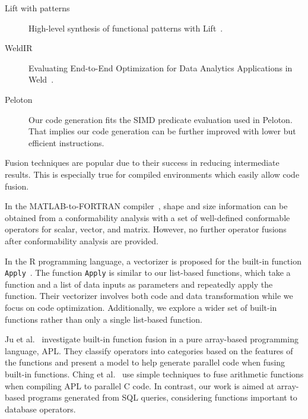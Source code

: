 

\begin{description}
\item[Lift with patterns] High-level synthesis of functional patterns with
    Lift~\cite{Kristien19:LiftPatterns}.
\item[WeldIR] Evaluating End-to-End Optimization for Data Analytics
    Applications in Weld~\cite{Palkar18:Weld}.
\item[Peloton] Our code generation fits the SIMD predicate evaluation used in
    Peloton. That implies our code generation can be further improved with
    lower but efficient instructions.
\end{description}


Fusion techniques are popular due to their success in reducing intermediate
results. This is especially true for compiled environments which easily
allow code fusion.

In the MATLAB-to-FORTRAN compiler~\cite{rose1999:techniques}, shape and size
information can be obtained from a conformability analysis with a set of
well-defined conformable operators for scalar, vector, and matrix.
However, no further operator fusions after conformability analysis are provided.

In the R programming language, a vectorizer is proposed for the built-in
function \texttt{Apply}~\cite{Wang2015:vectorization}. The function
\texttt{Apply} is similar to our list-based functions, which take
a function and a list of data inputs as parameters and repeatedly apply
the function. Their vectorizer involves both code and data transformation
while we focus on code optimization. Additionally, we explore a wider set
of built-in functions rather than only a single list-based function.

Ju et al.~\cite{ju1994:array} investigate built-in function fusion in a pure
array-based programming language, APL. They classify operators into categories
based on the features of the functions and present a model to help generate
parallel code when fusing built-in functions. Ching et al.~\cite{ChingZ12parallel}
use simple techniques to fuse arithmetic functions when compiling APL to parallel
C code. In contrast, our work is aimed at array-based programs generated from
SQL queries, considering functions important to database operators.

